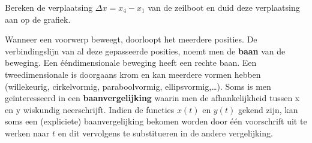\documentclass{ximera}
\begin{document}
\begin{image}
\end{image}

\begin{quickquestion*}{}{}
Bereken de verplaatsing \(\Delta x = x_4 - x_1\) van de zeilboot en duid deze verplaatsing aan op de grafiek.  
\end{quickquestion*}


Wanneer een voorwerp beweegt, doorloopt het meerdere posities. 
De verbindingslijn van al deze gepasseerde posities, noemt men de \textbf{baan} van de beweging. 
Een ééndimensionale beweging heeft een rechte baan. 
Een tweedimensionale is doorgaans krom en kan meerdere vormen hebben (willekeurig, cirkelvormig, paraboolvormig, ellipsvormig,\ldots). 
Soms is men geïnteresseerd in een \textbf{baanvergelijking} waarin men de afhankelijkheid tussen x en y wiskundig neerschrijft.
Indien de functies \(x(t)\) en \(y(t)\) gekend zijn, kan soms een (expliciete) baanvergelijking bekomen worden door één voorschrift uit te werken naar \(t\) en dit vervolgens te substitueren in de andere vergelijking.
\end{document}
